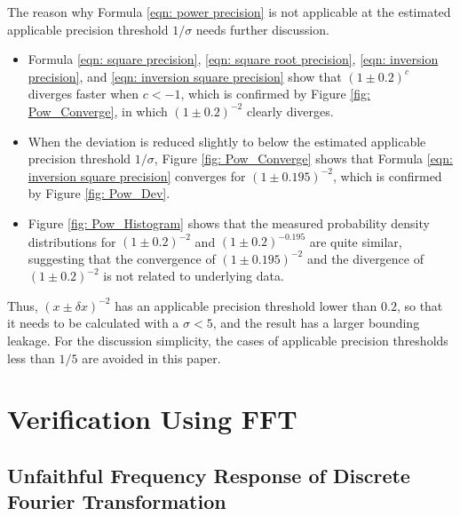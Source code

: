 \documentclass[twoside]{article}
\numberwithin{equation}{section}
\begin{document}
The reason why Formula \eqref{eqn: power precision} is not applicable at the estimated applicable precision threshold $1/\sigma$ needs further discussion.
\begin{itemize}
\item 
Formula \eqref{eqn: square precision}, \eqref{eqn: square root precision}, \eqref{eqn: inversion precision}, and \eqref{eqn: inversion square precision} show that $(1 \pm 0.2)^c$ diverges faster when $c<-1$, which is confirmed by Figure \ref{fig: Pow_Converge}, in which $(1 \pm 0.2)^{-2}$ clearly diverges.

\item 
When the deviation is reduced slightly to below the estimated applicable precision threshold $1/\sigma$, Figure \ref{fig: Pow_Converge} shows that Formula \eqref{eqn: inversion square precision} converges for $(1 \pm 0.195)^{-2}$, which is confirmed by Figure \ref{fig: Pow_Dev}.

\item
Figure \ref{fig: Pow_Histogram} shows that the measured probability density distributions for  $(1 \pm 0.2)^{-2}$ and  $(1 \pm 0.2)^{-0.195}$ are quite similar, suggesting that the convergence of $(1 \pm 0.195)^{-2}$ and the divergence of $(1 \pm 0.2)^{-2}$ is not related to underlying data. 

\end{itemize}
Thus, $(x \pm \delta x)^{-2}$ has an applicable precision threshold lower than $0.2$, so that it needs to be calculated with a $\sigma < 5$, and the result has a larger bounding leakage.
For the discussion simplicity, the cases of applicable precision thresholds less than $1/5$ are avoided in this paper.




\clearpage
\section{Verification Using FFT}
\label{sec: FFT}


\subsection{Unfaithful Frequency Response of Discrete Fourier Transformation \cite{Prev_Precision_Arithmetic}}
\end{document}
